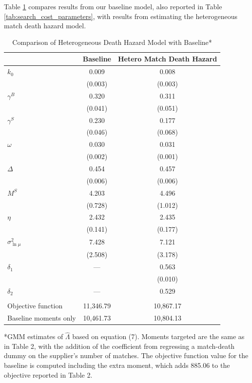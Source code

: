 \documentclass[12pt]{article} \usepackage{amsmath,amssymb,amsthm,geometry,graphicx,setspace,algorithm,algpseudocode,float}
\begin{document}
Table \ref{tab:hetero_parameters} compares results from our baseline model, also reported in Table \ref{tab:search_cost_parameters}, with results from estimating the heterogeneous match death hazard model.

\begin{table}[htbp]
\caption{Comparison of Heterogeneous Death Hazard Model with Baseline*}
\label{tab:hetero_parameters}
\centering
\begin{tabular}{lcc}
\toprule
& Baseline & Hetero Match Death Hazard \\
\midrule
$k_{0}$ & 0.009 & 0.008 \\
& (0.003) & (0.003) \\[0.5ex]
$\gamma^{B}$ & 0.320 & 0.311 \\
& (0.041) & (0.051) \\[0.5ex]
$\gamma^{S}$ & 0.230 & 0.177 \\
& (0.046) & (0.068) \\[0.5ex]
$\omega$ & 0.030 & 0.031 \\
& (0.002) & (0.001) \\[0.5ex]
$\Delta$ & 0.454 & 0.457 \\
& (0.006) & (0.006) \\[0.5ex]
$M^{S}$ & 4.203 & 4.496 \\
& (0.728) & (1.012) \\[0.5ex]
$\eta$ & 2.432 & 2.435 \\
& (0.141) & (0.177) \\[0.5ex]
$\sigma_{\ln \mu }^{2}$ & 7.428 & 7.121 \\
& (2.508) & (3.178) \\[0.5ex]
$\delta_1$ & --- & 0.563 \\
& & (0.010) \\[0.5ex]
$\delta_2$ & --- & 0.529 \\
& & \\
\midrule
Objective function & 11,346.79 & 10,867.17 \\
Baseline moments only & 10,461.73 & 10,804.13 \\
\bottomrule
\end{tabular}
\par\vspace{0.5em}
\begin{minipage}{\textwidth}\footnotesize
*GMM estimates of $\hat{\Lambda}$ based on equation (7). Moments targeted are the same as in Table 2, with the addition of the coefficient from regressing a match-death dummy on the supplier's number of matches. The objective function value for the baseline is computed including the extra moment, which adds 885.06 to the objective reported in Table 2.
\end{minipage}
\end{table}
\end{document}
